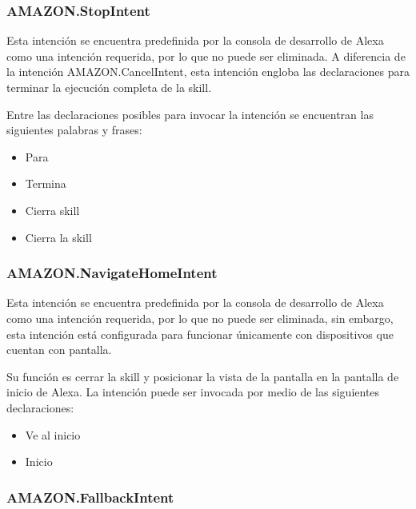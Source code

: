 \subsubsection{AMAZON.StopIntent}
\label{StopIntentcapIV}

Esta intención se encuentra predefinida por la consola de desarrollo de Alexa como una intención requerida, por lo que no puede ser eliminada. A diferencia de la intención AMAZON.CancelIntent, esta intención engloba las declaraciones para terminar la ejecución completa de la skill.

Entre las declaraciones posibles para invocar la intención se encuentran las siguientes palabras y frases:

\begin{itemize}
  \item Para
  \item Termina
  \item Cierra skill
  \item Cierra la skill
\end{itemize}


\subsubsection{AMAZON.NavigateHomeIntent}
\label{NavigateHomeIntentcapIV}

Esta intención se encuentra predefinida por la consola de desarrollo de Alexa como una intención requerida, por lo que no puede ser eliminada, sin embargo, esta intención está configurada para funcionar únicamente con dispositivos que cuentan con pantalla.

Su función es cerrar la skill y posicionar la vista de la pantalla en la pantalla de inicio de Alexa. La intención puede ser invocada por medio de las siguientes declaraciones:

\begin{itemize}
  \item Ve al inicio
  \item Inicio
\end{itemize}


\subsubsection{AMAZON.FallbackIntent}
\label{FallbackIntentcapIV}

